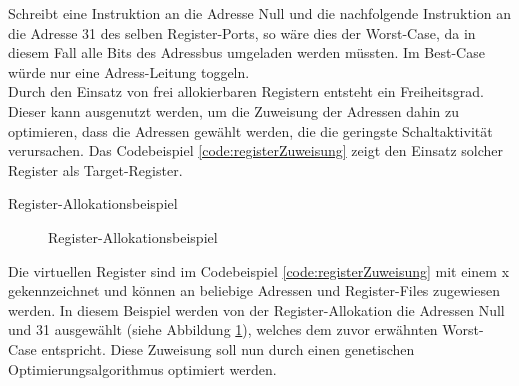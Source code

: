 Schreibt eine Instruktion an die Adresse Null und die nachfolgende Instruktion an die Adresse 31 des selben Register-Ports, so wäre dies der Worst-Case, da in diesem Fall alle Bits des Adressbus umgeladen werden müssten. Im Best-Case würde nur eine Adress-Leitung toggeln.\\
Durch den Einsatz von frei allokierbaren Registern entsteht ein Freiheitsgrad. Dieser kann ausgenutzt werden, um die Zuweisung der Adressen dahin zu optimieren, dass die Adressen gewählt werden, die die geringste Schaltaktivität verursachen. Das Codebeispiel \ref{code:registerZuweisung} zeigt den Einsatz solcher Register als Target-Register. 
\begin{algorithm}[H]
	\begin{algorithmic}[1]
		\caption{Register-Allokationsbeispiel}
		\label{code:registerZuweisung}
	\end{algorithmic}
\end{algorithm}

\begin{figure}[H] 
	\centering
	
	\caption{Register-Allokationsbeispiel}
	\label{fig:register_aloc_example}
\end{figure}
Die virtuellen Register sind im Codebeispiel \ref{code:registerZuweisung} mit einem x gekennzeichnet und können an beliebige Adressen und Register-Files zugewiesen werden. In diesem Beispiel werden von der Register-Allokation die Adressen Null und 31 ausgewählt (siehe Abbildung \ref{fig:register_aloc_example}), welches dem zuvor erwähnten Worst-Case entspricht. Diese Zuweisung soll nun durch einen genetischen Optimierungsalgorithmus optimiert werden.\\

